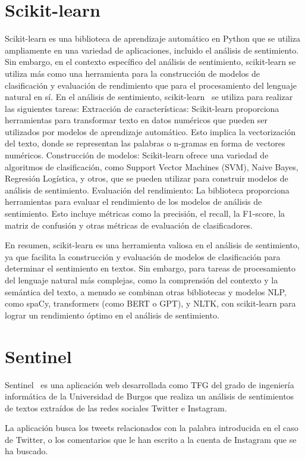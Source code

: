 \section{Scikit-learn}
Scikit-learn es una biblioteca de aprendizaje automático en Python que se utiliza ampliamente en una variedad de aplicaciones, incluido el análisis de sentimiento. Sin embargo, en el contexto específico del análisis de sentimiento, scikit-learn se utiliza más como una herramienta para la construcción de modelos de clasificación y evaluación de rendimiento que para el procesamiento del lenguaje natural en sí.
En el análisis de sentimiento, scikit-learn~\cite{scikit-learn-sentiment1} se utiliza para realizar las siguientes tareas:
Extracción de características: Scikit-learn proporciona herramientas para transformar texto en datos numéricos que pueden ser utilizados por modelos de aprendizaje automático. Esto implica la vectorización del texto, donde se representan las palabras o n-gramas en forma de vectores numéricos.
Construcción de modelos: Scikit-learn ofrece una variedad de algoritmos de clasificación, como Support Vector Machines (SVM), Naive Bayes, Regresión Logística, y otros, que se pueden utilizar para construir modelos de análisis de sentimiento.
Evaluación del rendimiento: La biblioteca proporciona herramientas para evaluar el rendimiento de los modelos de análisis de sentimiento. Esto incluye métricas como la precisión, el recall, la F1-score, la matriz de confusión y otras métricas de evaluación de clasificadores.

En resumen, scikit-learn es una herramienta valiosa en el análisis de sentimiento, ya que facilita la construcción y evaluación de modelos de clasificación para determinar el sentimiento en textos. Sin embargo, para tareas de procesamiento del lenguaje natural más complejas, como la comprensión del contexto y la semántica del texto, a menudo se combinan otras bibliotecas y modelos NLP, como spaCy, transformers (como BERT o GPT), y NLTK, con scikit-learn para lograr un rendimiento óptimo en el análisis de sentimiento.


\section{Sentinel}
Sentinel~\cite{Sentinel1} es una aplicación web desarrollada como TFG del grado de ingeniería informática de la Universidad de Burgos que realiza un análisis de sentimientos de textos extraídos de las redes sociales Twitter e Instagram.

La aplicación busca los tweets relacionados con la palabra introducida en el caso de Twitter, o los comentarios que le han escrito a la cuenta de Instagram que se ha buscado.


